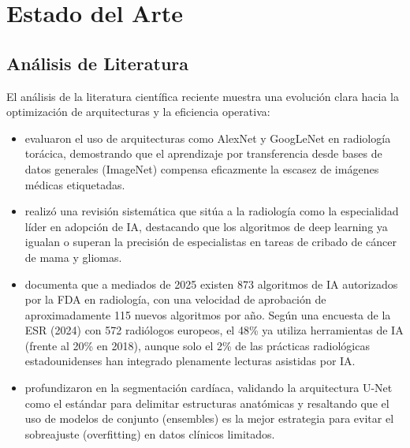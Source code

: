 \section{Estado del Arte}

\subsection{Análisis de Literatura}

El análisis de la literatura científica reciente muestra una evolución clara hacia la optimización de arquitecturas y la eficiencia operativa:

\begin{itemize}
\item \textcite{Shin2016} evaluaron el uso de arquitecturas como AlexNet y GoogLeNet en radiología torácica, demostrando que el aprendizaje por transferencia desde bases de datos generales (ImageNet) compensa eficazmente la escasez de imágenes médicas etiquetadas.

\item \textcite{MenchuLopez2025} realizó una revisión sistemática que sitúa a la radiología como la especialidad líder en adopción de IA, destacando que los algoritmos de deep learning ya igualan o superan la precisión de especialistas en tareas de cribado de cáncer de mama y gliomas.

\item \textcite{Laurent2025} documenta que a mediados de 2025 existen 873 algoritmos de IA autorizados por la FDA en radiología, con una velocidad de aprobación de aproximadamente 115 nuevos algoritmos por año. Según una encuesta de la ESR (2024) con 572 radiólogos europeos, el 48\% ya utiliza herramientas de IA (frente al 20\% en 2018), aunque solo el 2\% de las prácticas radiológicas estadounidenses han integrado plenamente lecturas asistidas por IA.

\item \textcite{PerezPelegri2023} profundizaron en la segmentación cardíaca, validando la arquitectura U-Net como el estándar para delimitar estructuras anatómicas y resaltando que el uso de modelos de conjunto (ensembles) es la mejor estrategia para evitar el sobreajuste (overfitting) en datos clínicos limitados.
\end{itemize}
